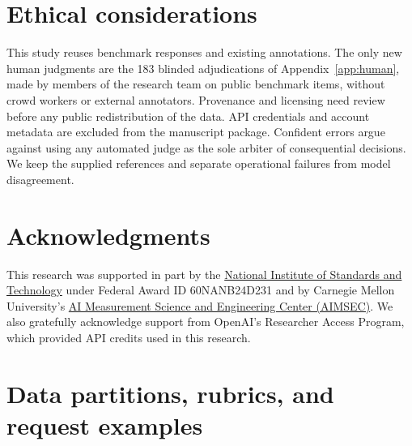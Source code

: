 \documentclass[11pt]{article}
\def\arxivbuild{1}
\begin{document}
\section*{Ethical considerations}
This study reuses benchmark responses and existing annotations. The only new human judgments are the 183 blinded adjudications of Appendix~\ref{app:human}, made by members of the research team on public benchmark items, without crowd workers or external annotators. Provenance and licensing need review before any public redistribution of the data. API credentials and account metadata are excluded from the manuscript package. Confident errors argue against using any automated judge as the sole arbiter of consequential decisions. We keep the supplied references and separate operational failures from model disagreement.

\section*{Acknowledgments}
This research was supported in part by the \href{https://ror.org/05xpvk416}{National Institute of Standards and Technology} under Federal Award ID 60NANB24D231 and by Carnegie Mellon University’s \href{https://www.cmu.edu/aimsec/research/index.html}{AI Measurement Science and Engineering Center (AIMSEC)}. We also gratefully acknowledge support from OpenAI’s Researcher Access Program, which provided API credits used in this research.



\clearpage
\appendix
\ifdefined\arxivbuild
\onecolumn
\newenvironment{appfigure}{\begin{figure}[!htbp]}{\end{figure}}
\newenvironment{apptable}{\begin{table}[!htbp]}{\end{table}}
\else
\newenvironment{appfigure}{\begin{figure}[!t]}{\end{figure}}
\newenvironment{apptable}{\begin{table}[!t]}{\end{table}}
\fi
\raggedbottom
\section{Data partitions, rubrics, and request examples}
\label{app:prompts}
\end{document}
